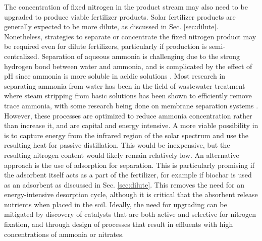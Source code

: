 The concentration of fixed nitrogen in the product stream may also need to be upgraded to produce viable fertilizer products. Solar fertilizer products are generally expected to be more dilute, as discussed in Sec. \ref{sec:dilute}. Nonetheless, strategies to separate or concentrate the fixed nitrogen product may be required even for dilute fertilizers, particularly if production is semi-centralized. Separation of aqueous ammonia is challenging due to the strong hydrogen bond between water and ammonia, and is complicated by the effect of pH since ammonia is more soluble in acidic solutions \cite{Evans_2007}. Most research in separating ammonia from water has been in the field of wastewater treatment where steam stripping from basic solutions has been shown to efficiently remove trace ammonia, with some research being done on membrane separation systems \cite{Yin_2018, Kinidi_2018, Hasano_lu_2010}. However, these processes are optimized to reduce ammonia concentration rather than increase it, and are capital and energy intensive. A more viable possibility in is to capture energy from the infrared region of the solar spectrum and use the resulting heat for passive distillation. This would be inexpensive, but the resulting nitrogen content would likely remain relatively low. An alternative approach is the use of adsorption for separation. This is particularly promising if the adsorbent itself acts as a part of the fertilizer, for example if biochar is used as an adsorbent as discussed in Sec. \ref{sec:dilute}. This removes the need for an energy-intensive desorption cycle, although it is critical that the absorbent release nutrients when placed in the soil. Ideally, the need for upgrading can be mitigated by discovery of catalysts that are both active and selective for nitrogen fixation, and through design of processes that result in effluents with high concentrations of ammonia or nitrates. 

